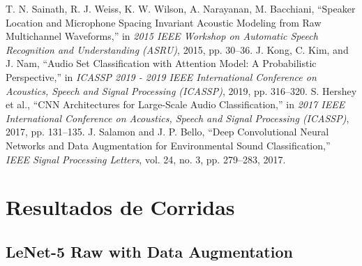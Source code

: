 \documentclass[conference]{IEEEtran}
\begin{document}
\begin{thebibliography}{00}
T. N. Sainath, R. J. Weiss, K. W. Wilson, A. Narayanan, M. Bacchiani, ``Speaker Location and Microphone Spacing Invariant Acoustic Modeling from Raw Multichannel Waveforms,'' in \textit{2015 IEEE Workshop on Automatic Speech Recognition and Understanding (ASRU)}, 2015, pp. 30--36.
J. Kong, C. Kim, and J. Nam, ``Audio Set Classification with Attention Model: A Probabilistic Perspective,'' in \textit{ICASSP 2019 - 2019 IEEE International Conference on Acoustics, Speech and Signal Processing (ICASSP)}, 2019, pp. 316--320.
S. Hershey et al., ``CNN Architectures for Large-Scale Audio Classification,'' in \textit{2017 IEEE International Conference on Acoustics, Speech and Signal Processing (ICASSP)}, 2017, pp. 131--135.
J. Salamon and J. P. Bello, ``Deep Convolutional Neural Networks and Data Augmentation for Environmental Sound Classification,'' \textit{IEEE Signal Processing Letters}, vol. 24, no. 3, pp. 279--283, 2017.
\end{thebibliography}

\appendices
\section{Resultados de Corridas}
\label{appendix:results}

\subsection{LeNet-5 Raw with Data Augmentation}
\end{document}
